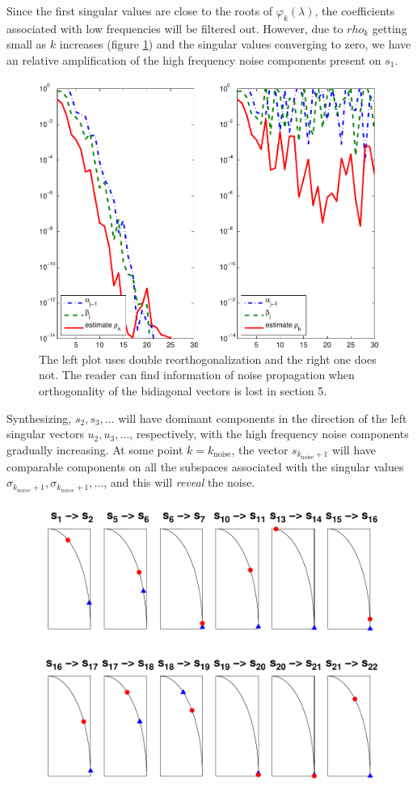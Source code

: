 \documentclass[11pt]{amsart}
\begin{document}
Since the first singular values are close to the roots of
$\varphi_{k}(\lambda)$, the coefficients associated with low frequencies will be
filtered out. However, due to $rho_{k}$ getting small as $k$ increases (figure
\ref{fig:rhok}) and the singular values converging to zero, we have an
relative amplification of the high frequency noise components present on 
$s_{1}$.
\begin{figure}[htb] 
  \begin{center}
    \includegraphics[width=0.55\linewidth]{figures/run1/alpha_beta_est}
  \end{center}
\caption{The left plot uses double reorthogonalization and the right one does
not. The reader can find information of noise propagation when orthogonality of
the bidiagonal vectors is lost in \cite{bidiagonalization} section 5.}
\label{fig:rhok}
\end{figure}

Synthesizing, $s_{2},s_{3},\ldots$ will have dominant components in the
direction of the left singular vectors $u_{2},u_{3},\ldots$, respectively, with
the high frequency noise components gradually increasing. At some point
$k = k_{\text{noise}}$, the vector $s_{k_{\text{noise}} + 1}$ will have
comparable components on all the subspaces associated with the singular values
$\sigma_{k_{noise} + 1}, \sigma_{k_{noise} + 1}, \ldots$, and this will 
\emph{reveal} the noise.

\begin{figure}[htb] 
  \begin{center}
    \includegraphics[width=0.55\linewidth]{figures/run1/signal_noise_space}
  \end{center}
\caption{}
\label{fig:snSpace}
\end{figure}
\end{document}
